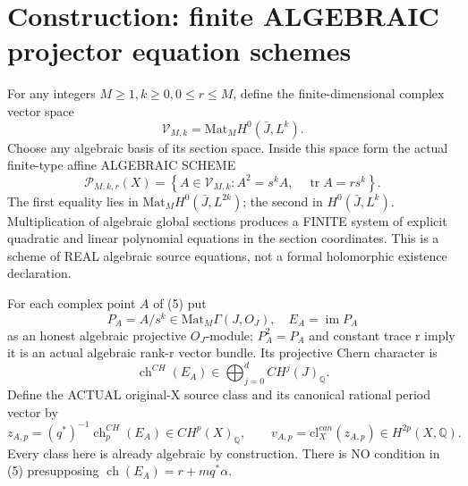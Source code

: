 \documentclass[11pt]{article}
\begin{document}
\section{Construction: finite ALGEBRAIC projector equation schemes}
For any integers \(M\ge1,k\ge0,0\le r\le M\), define
the finite-dimensional complex vector space
\[
 \mathcal V_{M,k}
     =\mathrm{Mat}_{M}H^0(\bar J,L^k).
\]
Choose any algebraic basis of its section space.
Inside this space form the actual finite-type affine
ALGEBRAIC SCHEME
\[
 \boxed{
 \mathcal P_{M,k,r}(X)=
 \left\{A\in\mathcal V_{M,k}:
       A^2=s^k A,\quad\operatorname{tr}A=r s^k\right\}.
 }                                                     \tag{5}
\]
The first equality lies in
\(\mathrm{Mat}_M H^0(\bar J,L^{2k})\);
the second in \(H^0(\bar J,L^k)\).
Multiplication of algebraic global sections produces
a FINITE system of explicit quadratic and linear
polynomial equations in the section coordinates.
This is a scheme of REAL algebraic source equations,
not a formal holomorphic existence declaration.

For each complex point \(A\) of (5) put
\[
 P_A=A/s^k\in\mathrm{Mat}_M\Gamma(J,O_J),\quad
 E_A=\operatorname{im}P_A
\]
as an honest algebraic projective \(O_J\)-module;
\(P_A^2=P_A\) and constant trace r imply it is an
actual algebraic rank-r vector bundle.
Its projective Chern character is
\[
 \operatorname{ch}^{CH}(E_A)
       \in\bigoplus_{j=0}^d CH^j(J)_{\mathbb Q}.
\]
Define the ACTUAL original-X source class and its
canonical rational period vector by
\[
 \boxed{
 z_{A,p}=(q^*)^{-1}
          \operatorname{ch}^{CH}_p(E_A)
                      \in CH^p(X)_{\mathbb Q},
 \qquad
 v_{A,p}=\mathrm{cl}^{can}_X(z_{A,p})
                      \in H^{2p}(X,\mathbb Q).
 }                                                     \tag{6}
\]
Every class here is already algebraic by construction.
There is NO condition in (5) presupposing
\(\operatorname{ch}(E_A)=r+m q^*\alpha\).
\end{document}
